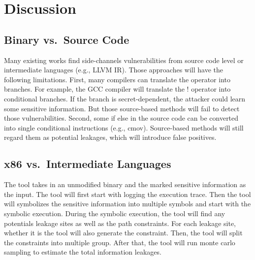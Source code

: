 \section{Discussion}

\subsection{Binary vs.\ Source Code}
Many existing works find side-channels vulnerabilities from source code level 
or intermediate languages (e.g., LLVM IR). Those approaches will have the following limitations. 
First, many compilers can translate the operator into branches. For example, 
the GCC compiler will translate the ! operator into conditional branches. 
If the branch is secret-dependent, the attacker could learn some sensitive information.
But those source-based methods will fail to detect those vulnerabilities. 
Second, some if else in the source code can be converted into single conditional 
instructions (e.g., cmov). Source-based methods will still regard them as potential leakages, 
which will introduce false positives.

\subsection{x86 vs.\ Intermediate Languages}
The tool takes in an unmodified binary and the marked sensitive information as the input. 
The tool will first start with logging the execution trace. Then the tool will symbolizes the 
sensitive information into multiple symbols and start with the symbolic execution. 
During the symbolic execution, the tool will find any potentials leakage sites as well as the path constraints. 
For each leakage site, whether it is  the tool will also generate the constraint. 
Then, the tool will split the constraints into multiple group. After that, 
the tool will run monte carlo sampling to estimate the total information leakages.
